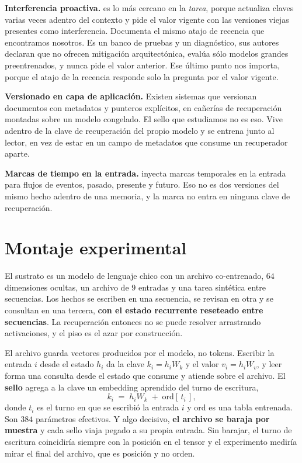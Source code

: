 \documentclass[11pt,a4paper]{article}
\begin{document}
\textbf{Interferencia proactiva.} \citet{unabletoforget} es lo más cercano en la \emph{tarea}, porque
actualiza claves varias veces adentro del contexto y pide el valor vigente con las versiones viejas
presentes como interferencia. Documenta el mismo atajo de recencia que encontramos nosotros. Es un
banco de pruebas y un diagnóstico, sus autores declaran que no ofrecen mitigación arquitectónica,
evalúa sólo modelos grandes preentrenados, y nunca pide el valor anterior. Ese último punto nos
importa, porque el atajo de la recencia responde solo la pregunta por el valor vigente.

\textbf{Versionado en capa de aplicación.} Existen sistemas que versionan documentos con metadatos y
punteros explícitos, en cañerías de recuperación montadas sobre un modelo congelado. El sello que
estudiamos no es eso. Vive adentro de la clave de recuperación del propio modelo y se entrena junto al
lector, en vez de estar en un campo de metadatos que consume un recuperador aparte.

\textbf{Marcas de tiempo en la entrada.} \citet{tslm} inyecta marcas temporales en la entrada para
flujos de eventos, pasado, presente y futuro. Eso no es dos versiones del mismo hecho adentro de una
memoria, y la marca no entra en ninguna clave de recuperación.

\section{Montaje experimental}

El sustrato es un modelo de lenguaje chico con un archivo co-entrenado, $64$ dimensiones ocultas, un
archivo de $9$ entradas y una tarea sintética entre secuencias. Los hechos se escriben en una
secuencia, se revisan en otra y se consultan en una tercera, \textbf{con el estado recurrente reseteado
entre secuencias}. La recuperación entonces no se puede resolver arrastrando activaciones, y el piso
es el azar por construcción.

El archivo guarda vectores producidos por el modelo, no tokens. Escribir la entrada $i$ desde el
estado $h_i$ da la clave $k_i = h_i W_k$ y el valor $v_i = h_i W_v$, y leer forma una consulta desde el
estado que consume y atiende sobre el archivo. El \textbf{sello} agrega a la clave un embedding
aprendido del turno de escritura,
\[
k_i \;=\; h_i W_k \;+\; \mathrm{ord}[\,t_i\,],
\]
donde $t_i$ es el turno en que se escribió la entrada $i$ y $\mathrm{ord}$ es una tabla entrenada. Son
$384$ parámetros efectivos. Y algo decisivo, \textbf{el archivo se baraja por muestra} y cada sello
viaja pegado a su propia entrada. Sin barajar, el turno de escritura coincidiría siempre con la
posición en el tensor y el experimento mediría mirar el final del archivo, que es posición y no orden.
\end{document}
